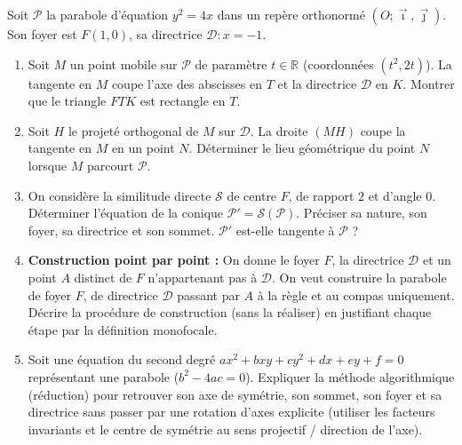 \documentclass[11pt]{article}
\begin{document}
\begin{exercice}
Soit $\mathcal{P}$ la parabole d'équation $y^2 = 4x$ dans un repère orthonormé $(O;\vec{\imath},\vec{\jmath})$. Son foyer est $F(1,0)$, sa directrice $\mathcal{D} : x = -1$.
\begin{enumerate}
    \item Soit $M$ un point mobile sur $\mathcal{P}$ de paramètre $t \in \mathbb{R}$ (coordonnées $(t^2, 2t)$). La tangente en $M$ coupe l'axe des abscisses en $T$ et la directrice $\mathcal{D}$ en $K$. Montrer que le triangle $FTK$ est rectangle en $T$.
    \item Soit $H$ le projeté orthogonal de $M$ sur $\mathcal{D}$. La droite $(MH)$ coupe la tangente en $M$ en un point $N$. Déterminer le lieu géométrique du point $N$ lorsque $M$ parcourt $\mathcal{P}$.
    \item On considère la similitude directe $\mathcal{S}$ de centre $F$, de rapport $2$ et d'angle $0$. Déterminer l'équation de la conique $\mathcal{P}' = \mathcal{S}(\mathcal{P})$. Préciser sa nature, son foyer, sa directrice et son sommet. $\mathcal{P}'$ est-elle tangente à $\mathcal{P}$ ?
    \item \textbf{Construction point par point :} On donne le foyer $F$, la directrice $\mathcal{D}$ et un point $A$ distinct de $F$ n'appartenant pas à $\mathcal{D}$. On veut construire la parabole de foyer $F$, de directrice $\mathcal{D}$ passant par $A$ à la règle et au compas uniquement. Décrire la procédure de construction (sans la réaliser) en justifiant chaque étape par la définition monofocale.
    \item Soit une équation du second degré $ax^2 + bxy + cy^2 + dx + ey + f = 0$ représentant une parabole ($b^2 - 4ac = 0$). Expliquer la méthode algorithmique (réduction) pour retrouver son axe de symétrie, son sommet, son foyer et sa directrice sans passer par une rotation d'axes explicite (utiliser les facteurs invariants et le centre de symétrie au sens projectif / direction de l'axe).
\end{enumerate}
\end{exercice}
\end{document}
